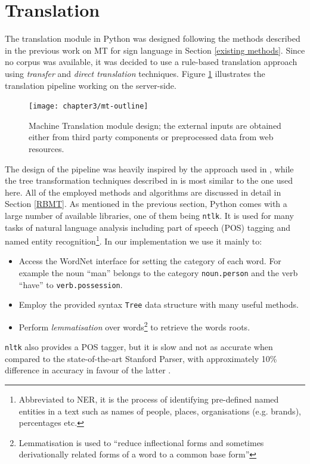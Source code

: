 \documentclass[12pt]{ociamthesis}  %
\newcommand{\tech}{\texttt}
\begin{document}
\section{Translation}
The translation module in Python was designed following the methods described in the previous work on MT for sign language in Section \ref{existing methods}. Since no corpus was available, it was decided to use a rule-based translation approach using \textit{transfer} and \textit{direct translation} techniques. Figure \ref{fig:mt-outline} illustrates the translation pipeline working on the server-side. 
\begin{figure}[h]
	\centering
    \texttt{[image: chapter3/mt-outline]}
    \caption[Machine Translation module design]{Machine Translation module design; the external inputs are obtained either from third party components or preprocessed data from web resources.}
    \label{fig:mt-outline}
\end{figure}

The design of the pipeline was heavily inspired by the approach used in , while the tree transformation techniques described in  is most similar to the one used here. All of the employed methods and algorithms are discussed in detail in Section \ref{RBMT}. As mentioned in the previous section, Python comes with a large number of available libraries, one of them being \tech{ntlk}. It is used for many tasks of natural language analysis including part of speech (POS) tagging and named entity recognition\footnote{Abbreviated to NER, it is the process of identifying pre-defined named entities in a text such as names of people, places, organisations (e.g. brands), percentages etc.}. In our implementation we use it mainly to:
\begin{itemize}
	\item Access the WordNet interface for setting the category of each word. For example the noun ``man'' belongs to the category \texttt{noun.person} and the verb ``have'' to \texttt{verb.possession}.
	\item Employ the provided syntax \texttt{Tree} data structure with many useful methods.
	\item Perform \textit{lemmatisation} over words\footnote{Lemmatisation is used to ``reduce inflectional forms and sometimes derivationally related forms of a word to a common base form'' } to retrieve the words roots.
\end{itemize}
\tech{nltk} also provides a POS tagger, but it is slow and not as accurate when compared to the state-of-the-art Stanford Parser, with approximately 10\% difference in accuracy in favour of the latter . 
\end{document}
